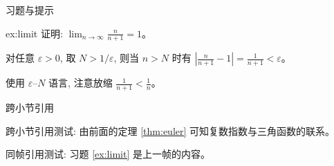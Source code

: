
\begin{frame}{习题与提示}
  \begin{exercise}{}{ex:limit}
    证明: $\displaystyle\lim_{n \to \infty} \frac{n}{n+1} = 1$。
  \end{exercise}

  \pause

  \begin{solution}
    对任意 $\varepsilon > 0$, 取 $N > 1/\varepsilon$, 则当 $n > N$ 时有
    $\left|\frac{n}{n+1} - 1\right| = \frac{1}{n+1} < \varepsilon$。
  \end{solution}

  \begin{hint}[思路提示]
    使用 $\varepsilon$--$N$ 语言, 注意放缩 $\frac{1}{n+1} < \frac{1}{n}$。
  \end{hint}
\end{frame}

\begin{frame}{跨小节引用}
  \begin{remark}{}{}
    跨小节引用测试: 由前面的定理 \ref{thm:euler} 可知复数指数与三角函数的联系。
  \end{remark}

  \begin{remark}{}{}
    同帧引用测试: 习题 \ref{ex:limit} 是上一帧的内容。
  \end{remark}
\end{frame}
